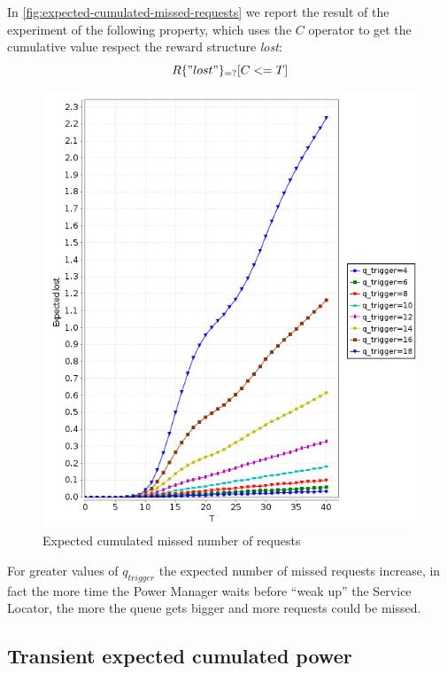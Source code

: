 In \autoref{fig:expected-cumulated-missed-requests} we report the
result of the experiment of the following property, which uses the $C$
operator to get the cumulative value respect the reward structure
\emph{lost}:
\begin{displaymath}
  R\{"lost"\}_{=?} [ C<=T ]
\end{displaymath}
\begin{figure}[htb]
  \centering
  \includegraphics[width=13cm,
  height=13cm]{quantitative-project/expected-missed-requests.png}
  \caption{Expected cumulated missed number of requests}
  \label{fig:expected-cumulated-missed-requests}
\end{figure}
For greater values of $q_{trigger}$ the expected number of missed
requests increase, in fact the more time the Power Manager waits
before ``weak up'' the Service Locator, the more the queue gets bigger
and more requests could be missed.

\subsection{Transient expected cumulated power }

